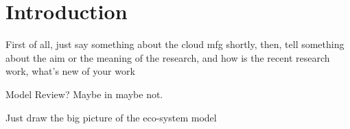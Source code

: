 \section{Introduction}
First of all, just say something about the cloud mfg shortly,
then, tell something about the aim or the meaning of the research,
and how is the recent research work, what's new of your work

Model Review? Maybe in maybe not.

Just draw the big picture of the eco-system model 